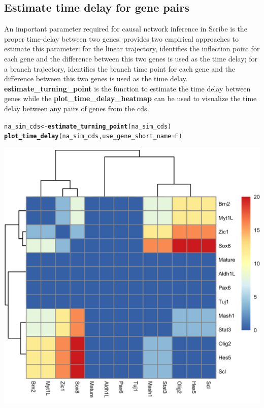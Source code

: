 \documentclass[10pt,oneside]{article}\usepackage[]{graphicx}\usepackage[]{color}
\makeatletter
\def\maxwidth{ %
  \ifdim\Gin@nat@width>\linewidth
    \linewidth
  \else
    \Gin@nat@width
  \fi
}
\newcommand{\hlstd}[1]{\textcolor[rgb]{0.345,0.345,0.345}{#1}}%
\newcommand{\hlkwb}[1]{\textcolor[rgb]{0.69,0.353,0.396}{#1}}%
\newcommand{\hlkwc}[1]{\textcolor[rgb]{0.333,0.667,0.333}{#1}}%
\newcommand{\hlkwd}[1]{\textcolor[rgb]{0.737,0.353,0.396}{\textbf{#1}}}%
\newenvironment{kframe}{%
 \def\at@end@of@kframe{}%
 \ifinner\ifhmode%
  \def\at@end@of@kframe{\end{minipage}}%
  \begin{minipage}{\columnwidth}%
 \fi\fi%
 \def\FrameCommand##1{\hskip\@totalleftmargin \hskip-\fboxsep
 \colorbox{shadecolor}{##1}\hskip-\fboxsep
     \hskip-\linewidth \hskip-\@totalleftmargin \hskip\columnwidth}%
 \MakeFramed {\advance\hsize-\width
   \@totalleftmargin\z@ \linewidth\hsize
   \@setminipage}}%
 {\par\unskip\endMakeFramed%
 \at@end@of@kframe}
\newenvironment{knitrout}{}{} %
\makeatother
\begin{document}
\subsection{Estimate time delay for gene pairs}

An important parameter required for causal network inference in Scribe is the proper time-delay between two genes.  provides two empirical approaches to estimate this parameter: for the linear trajectory,  identifies the inflection point for each gene and the difference between this two genes is used as the time delay; for a branch trajectory,  identifies the branch time point for each gene and the difference between this two genes is used as the time delay. \textbf{estimate\_turning\_point} is the function to estimate the time delay between genes while the \textbf{plot\_time\_delay\_heatmap} can be used to visualize the time delay between any pairs of genes from the cds.

\begin{knitrout}
\color{fgcolor}\begin{kframe}
\begin{alltt}
\hlstd{na_sim_cds} \hlkwb{<-} \hlkwd{estimate_turning_point}\hlstd{(na_sim_cds)}
\hlkwd{plot_time_delay}\hlstd{(na_sim_cds,} \hlkwc{use_gene_short_name} \hlstd{= F)}
\end{alltt}


{\ttfamily\noindent\itshape\color{messagecolor}{\#\# There is NA values in turining points calculated, the time delay is set to 0 by default}}\end{kframe}

{\centering \includegraphics[width=\maxwidth]{figure/plot_time_delay_heatmap-1} 

}



\end{knitrout}
\end{document}
